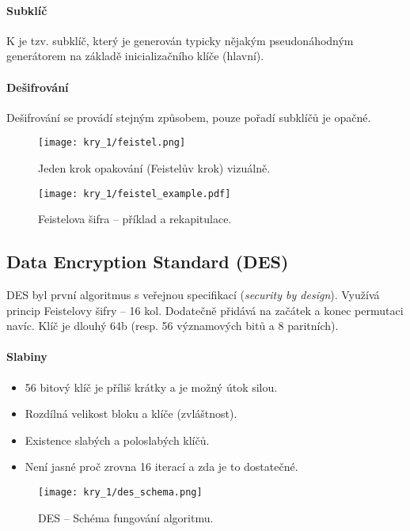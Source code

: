 \paragraph*{Subklíč} K je tzv. subklíč, který je generován typicky nějakým pseudonáhodným generátorem na základě inicializačního klíče (hlavní).

\paragraph*{Dešifrování} Dešifrování se provádí stejným způsobem, pouze pořadí subklíčů je opačné.

\begin{figure}[H]
    \centering
    \texttt{[image: kry\_1/feistel.png]}
    \caption{Jeden krok opakování (Feistelův krok) vizuálně.}
\end{figure}

\begin{figure}[H]
    \centering
    \texttt{[image: kry\_1/feistel\_example.pdf]}
    \caption{Feistelova šifra -- příklad a rekapitulace.}
\end{figure}

\subsection*{Data Encryption Standard (DES)}

DES byl první algoritmus s veřejnou specifikací (\textit{security by design}). Využívá princip Feistelovy šifry -- 16 kol. Dodatečně přidává na začátek a konec permutaci navíc. Klíč je dlouhý 64b (resp. 56 významových bitů a 8 paritních).

\paragraph*{Slabiny} \begin{itemize}
    \item 56 bitový klíč je příliš krátky a je možný útok silou.
    \item Rozdílná velikost bloku a klíče (zvláštnost).
    \item Existence slabých a poloslabých klíčů.
    \item Není jasné proč zrovna 16 iterací a zda je to dostatečné.
\end{itemize}

\begin{figure}[H]
    \centering
    \texttt{[image: kry\_1/des\_schema.png]}
    \caption{DES -- Schéma fungování algoritmu.}
\end{figure}

